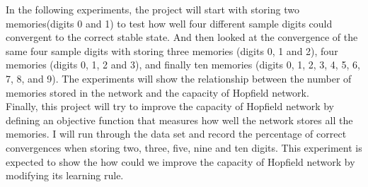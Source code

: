 In the following experiments, the project will start with storing two memories(digits 0 and 1) to test how well four different sample digits could convergent to the correct stable state. And then looked at the convergence of the same four sample digits with storing three memories (digits 0, 1 and 2), four memories (digits 0, 1, 2 and 3), and finally ten memories (digits 0, 1, 2, 3, 4, 5, 6, 7, 8, and 9). The experiments will show the relationship between the number of memories stored in the network and the capacity of Hopfield network. \\

Finally, this project will try to improve the capacity of Hopfield network by defining an objective function that measures how well the network stores all the memories. I will run through the data set and record the percentage of correct convergences when storing two, three, five, nine and ten digits. This experiment is expected to show the how could we improve the capacity of Hopfield network by modifying its learning rule.
